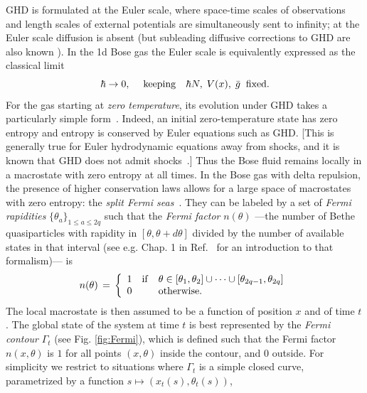 \documentclass[twocolumn,amsfonts,showpacs,superscriptaddress]{revtex4-1}
\begin{document}
GHD is formulated at the Euler scale, where space-time scales of observations and length scales of external potentials are simultaneously sent to infinity; at the Euler scale diffusion is absent (but subleading diffusive corrections to GHD are also known  \cite{de2018hydrodynamic,10.21468/SciPostPhys.6.4.049,gopalakrishnan2018hydrodynamics}). In the 1d Bose gas the Euler scale is equivalently expressed as the  classical limit~\cite{brun2017one,brun2018inhomogeneous,ruggiero2019conformal}
\begin{equation}
	\label{eq:limit}
	 \hbar \rightarrow 0 , \quad \; {\rm keeping} \quad \hbar N, \; V(x), \; \bar{g} \; \; {\rm fixed }.
\end{equation}
For the gas starting at {\it zero temperature}, its evolution under GHD takes a particularly simple form~\cite{doyon2017large}. Indeed, an initial zero-temperature state has zero entropy and entropy is conserved by Euler equations such as GHD. [This is generally true for Euler hydrodynamic equations away from shocks, and it is known that GHD does not admit shocks~\cite{el2005kinetic,doyon2017large,bulchandani2017classical}.] Thus the Bose fluid remains locally in a macrostate with zero entropy at all times. In the Bose gas with delta repulsion, the presence of higher conservation laws allows for a large space of macrostates with zero entropy: the {\it split Fermi seas}~\cite{fokkema2014split,eliens2016general,vlijm2016correlations,eliens2017quantum}. They can be labeled by a set of {\it Fermi rapidities} $\{\theta_a\}_{1\leq a\leq 2q}$ such that the {\it Fermi factor} $n(\theta)$ ---the number of Bethe quasiparticles with rapidity in $[\theta, \theta + d \theta]$ divided by the number of available states in that interval (see e.g. Chap. 1 in Ref.~\cite{korepin1997quantum}  for an introduction to that formalism)--- is
\begin{equation}
	n(\theta) \, = \, \left\{ \begin{array}{rcl} 
		1 & {\rm if} & \theta \in [\theta_1 ,\theta_2] \cup \dots \cup [\theta_{2q-1},\theta_{2q}] \\
		0 & & {\rm otherwise} .
		\end{array}
	 \right.
\end{equation}
The local macrostate is then assumed to be a function of position $x$ and of time $t$. The global state of the system at time $t$ is best represented by the {\it Fermi contour} $\Gamma_t$ (see Fig. \ref{fig:Fermi}), which is defined such that the Fermi factor $n(x,\theta)$ is $1$ for all points $(x,\theta)$ inside the contour, and $0$ outside. For simplicity we restrict to situations where $\Gamma_t$ is a simple closed curve, parametrized by a function $s \mapsto (x_t(s), \theta_t(s))$,
\end{document}
